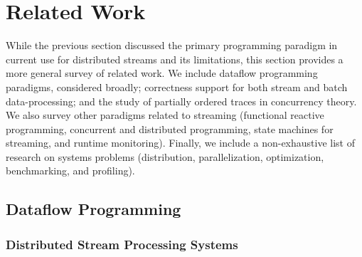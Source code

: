 \chapter{Related Work}
\label{cha:rw}


While the previous section discussed the primary programming paradigm in current use for distributed streams and its limitations, this section provides a more general survey of related work. We include dataflow programming paradigms, considered broadly; correctness support for both stream and batch data-processing; and the study of partially ordered traces in concurrency theory. We also survey other paradigms related to streaming (functional reactive programming, concurrent and distributed programming, state machines for streaming, and runtime monitoring). Finally, we include a non-exhaustive list of research on systems problems (distribution, parallelization, optimization, benchmarking, and profiling).

\section{Dataflow Programming}

\subsection{Distributed Stream Processing Systems}

